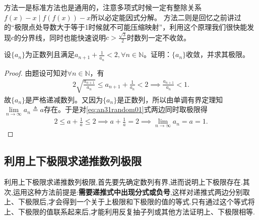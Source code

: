 \documentclass[../../main.tex]{subfiles}%
\begin{document}
\begin{remark}
{\color{blue}方法一}是标准方法也是通用的，注意多项式时候一定有整除关系\(f(x) - x\mid f(f(x)) - x\)所以必定能因式分解。
{\color{blue}方法二}则是回忆之前讲过的“极限点处导数大于等于1时候就不可能压缩映射”，利用这个原理我们很快能发现\(c\)的分界线，同时也能快速说明\(c>\frac{\sqrt{3}}{2}\)时数列一定不收敛。
\end{remark}

\begin{example}
设$\{a_n\}$为正数列且满足$a_{n+1}+\frac{1}{a_n}<2,\forall n\in \mathbb{N}$。证明：$\{a_n\}$收敛，并求其极限。
\end{example}
\begin{proof}

由题设可知对$\forall n\in \mathbb{N}$，有
\begin{align}
2\sqrt{\frac{a_{n+1}}{a_n}}\leqslant a_{n+1}+\frac{1}{a_n}<2\implies \frac{a_{n+1}}{a_n}<1.\label{eq:an31random01}
\end{align}
故$\{a_n\}$是严格递减数列。又因为$\{a_n\}$是正数列，所以由单调有界定理知$\lim\limits_{n\rightarrow \infty}a_n\triangleq a$存在。于是对\eqref{eq:an31random01}式两边同时取极限得
\begin{align*}
2\leqslant a+\frac{1}{a}\leqslant 2\implies a+\frac{1}{a}=2\implies \lim_{n\rightarrow \infty}a_n=a=1.
\end{align*}
\end{proof}





\subsection{利用上下极限求递推数列极限}

利用上下极限求递推数列极限,首先要先确定数列有界,进而说明上下极限存在.其次,运用这种方法前提是:\textbf{需要递推式中出现分式或负号},这样对递推式两边分别取上、下极限后,才会得到一个关于上极限和下极限的值的等式.只有通过这个等式将上、下极限的值联系起来后,才能利用反复抽子列或其他方法证明上、下极限相等.
\end{document}
